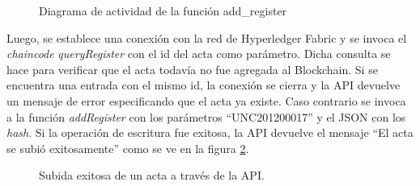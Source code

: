 \begin{figure}
    \caption{Diagrama de actividad de la función add\_register}
    \label{fig:actividad_add_register}
\end{figure}

Luego, se establece una conexión con la red de Hyperledger Fabric y se invoca el \textit{chaincode} \textit{queryRegister} con el id del acta como parámetro. Dicha consulta se hace para verificar que el acta todavía no fue agregada al Blockchain. Si se encuentra una entrada con el mismo id, la conexión se cierra y la API devuelve un mensaje de error especificando que el acta ya existe. Caso contrario se invoca a la función \textit{addRegister} con los parámetros ``UNC201200017'' y el JSON con los \textit{hash}. Si la operación de escritura fue exitosa, la API devuelve el mensaje ``El acta se subió exitosamente'' como se ve en la figura \ref{fig:add_register_api}.

\begin{figure}[H]
    \caption{Subida exitosa de un acta a través de la API.}
    \label{fig:add_register_api}
\end{figure}

